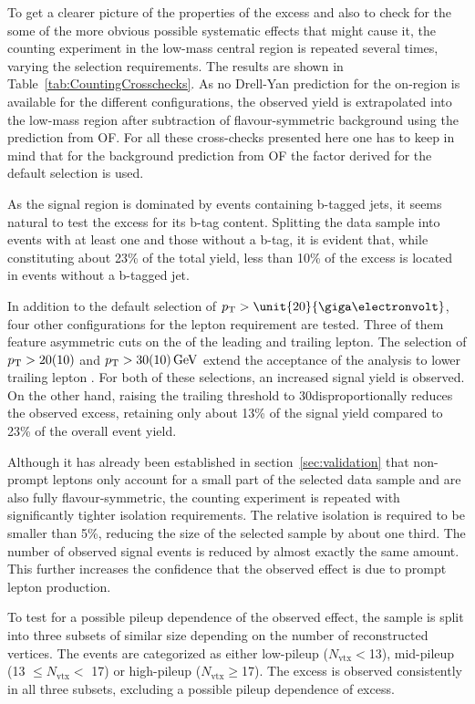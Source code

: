 To get a clearer picture of the properties of the excess and also to check for the some of the more obvious possible systematic effects that might cause it, the counting experiment in the low-mass central region is repeated several times, varying the selection requirements. The results are shown in Table~\ref{tab:CountingCrosschecks}. As no Drell-Yan prediction for the on-\Z region is available for the different configurations, the observed yield is extrapolated into the low-mass region after subtraction of flavour-symmetric background using the prediction from OF. For all these cross-checks presented here one has to keep in mind that for the background prediction from OF the \Rsfof factor derived for the default selection is used.

As the signal region is dominated by events containing b-tagged jets, it seems natural to test the excess for its b-tag content. Splitting the data sample into events with at least one and those without a b-tag, it is evident that, while constituting about 23\% of the total yield, less than 10\% of the excess is located in events without a b-tagged jet. 

In addition to the default selection of $\pt > \unit{20}{\giga\electronvolt}$, four other configurations for the lepton \pt requirement are tested. Three of them feature asymmetric cuts on the \pt of the leading and trailing lepton. The selection of $p_{\mathrm{T}} > 20(10)$ and $ p_{\mathrm{T}} > 30(10)\,\mathrm{Ge\hspace{-.08em}V}$ extend the acceptance of the analysis to lower trailing lepton \pt. For both of these selections, an increased signal yield is observed. On the other hand, raising the trailing \pt threshold to 30\GeV disproportionally reduces the observed excess, retaining only about 13\% of the signal yield compared to 23\% of the overall event yield. 

Although it has already been established in section~\ref{sec:validation} that non-prompt leptons only account for a small part of the selected data sample and are also fully flavour-symmetric, the counting experiment is repeated with significantly tighter isolation requirements. The relative isolation is required to be smaller than 5\%, reducing the size of the selected sample by about one third. The number of observed signal events is reduced by almost exactly the same amount. This further increases the confidence that the observed effect is due to prompt lepton production.

To test for a possible pileup dependence of the observed effect, the sample is split into three subsets of similar size depending on the number of reconstructed vertices. The events are categorized as either low-pileup ($N_{\mathrm{vtx}} < $13), mid-pileup (13 $\leq N_{\mathrm{vtx}} <$ 17) or high-pileup ($N_{\mathrm{vtx}} \geq $17). The excess is observed consistently in all three subsets, excluding a possible pileup dependence of excess. 

